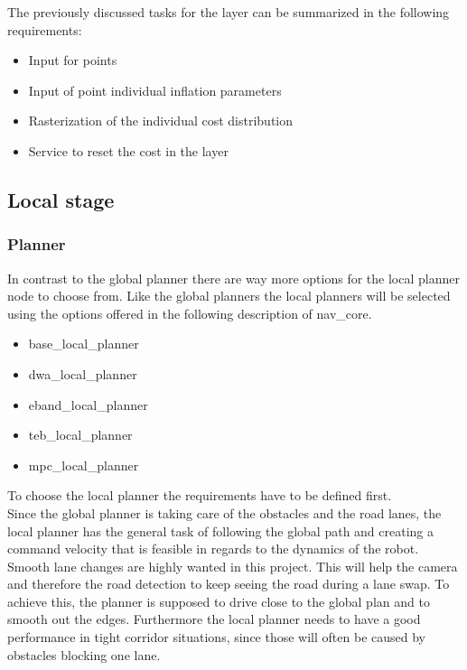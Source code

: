 The previously discussed tasks for the layer can be summarized in the following requirements:

\begin{itemize}
	\item Input for points
	\item Input of point individual inflation parameters
	\item Rasterization of the individual cost distribution
	\item Service to reset the cost in the layer
\end{itemize}



\subsection{Local stage}
\subsubsection{Planner}
In contrast to the global planner there are way more options for the local planner node to choose from. Like the global planners the local planners will be selected using the options offered in the following description of nav\_core\cite{navcore}.

\begin{itemize}
	\item base\_local\_planner
	\item dwa\_local\_planner
	\item eband\_local\_planner
	\item teb\_local\_planner
	\item mpc\_local\_planner
\end{itemize}

To choose the local planner the requirements have to be defined first.\\

Since the global planner is taking care of the obstacles and the road lanes, the local planner has the general task of following the global path and creating a command velocity that is feasible in regards to the dynamics of the robot.\\

Smooth lane changes are highly wanted in this project. This will help the camera and therefore the road detection to keep seeing the road during a lane swap. To achieve this, the planner is supposed to drive close to the global plan and to smooth out the edges.
Furthermore the local planner needs to have a good performance in tight corridor situations, since those will often be caused by obstacles blocking one lane.\\

